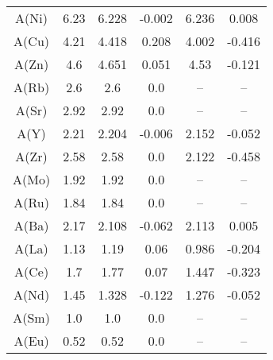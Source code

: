\begin{table}[ht]
\begin{tabular}{cccccc}
A(Ni) & 6.23 & 6.228 & -0.002 & 6.236 & 0.008 \\
A(Cu) & 4.21 & 4.418 & 0.208 & 4.002 & -0.416 \\
A(Zn) & 4.6 & 4.651 & 0.051 & 4.53 & -0.121 \\
A(Rb) & 2.6 & 2.6 & 0.0 & -- & -- \\
A(Sr) & 2.92 & 2.92 & 0.0 & -- & -- \\
A(Y) & 2.21 & 2.204 & -0.006 & 2.152 & -0.052 \\
A(Zr) & 2.58 & 2.58 & 0.0 & 2.122 & -0.458 \\
A(Mo) & 1.92 & 1.92 & 0.0 & -- & -- \\
A(Ru) & 1.84 & 1.84 & 0.0 & -- & -- \\
A(Ba) & 2.17 & 2.108 & -0.062 & 2.113 & 0.005 \\
A(La) & 1.13 & 1.19 & 0.06 & 0.986 & -0.204 \\
A(Ce) & 1.7 & 1.77 & 0.07 & 1.447 & -0.323 \\
A(Nd) & 1.45 & 1.328 & -0.122 & 1.276 & -0.052 \\
A(Sm) & 1.0 & 1.0 & 0.0 & -- & -- \\
A(Eu) & 0.52 & 0.52 & 0.0 & -- & -- \\
\hline
\end{tabular}
\end{table}